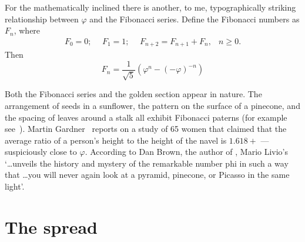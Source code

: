 \documentclass[10pt,a4paper,oneside,extrafontsizes]{memoir}%
\begin{document}
\begin{paracol}{2}
    For the mathematically inclined there is another, to me, typographically
striking
relationship between $\varphi$ and the Fibonacci series. Define the
Fibonacci numbers as $F_{n}$, where
\begin{equation}
\begin{array}{cccc}
F_{0} = 0;\ \ & F_{1}=1;\ \ & F_{n+2}=F_{n+1} + F_{n},  &  n \geq 0.
\end{array}
\end{equation}
Then
\begin{equation}
 F_{n} = \frac{1}{\sqrt{5}}(\varphi^{n} - (- \varphi)^{-n})
\end{equation}

    Both the Fibonacci series and the golden section appear in nature.
The arrangement of seeds in a sunflower, the pattern on the surface of a 
pinecone, and the spacing of leaves around a stalk all exhibit Fibonacci
paterns (for example see~\autocite{CONWAY96}). Martin Gardner~\autocite{GARDNER66}
reports on a study of 65 women that claimed that the average ratio of a 
person's height to the height of the navel is $1.618+$ --- suspiciously 
close to $\varphi$. According to Dan Brown, the author of 
, Mario Livio's 
~\autocite{LIVIO02} 
`\ldots unveils the history and mystery of the remarkable
number phi in such a way that \ldots you will never again look at a pyramid,
pinecone, or Picasso in the same light'.
\end{paracol}



\section{The spread} \label{sec:spread}
\end{document}
